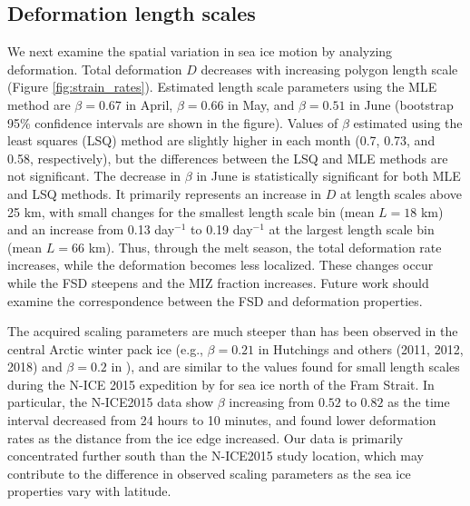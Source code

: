 \documentclass[review, jog]{igs}
\begin{document}
\subsection{Deformation length scales}
We next examine the spatial variation in sea ice motion by analyzing deformation.
Total deformation $D$ decreases with increasing polygon length scale (Figure \ref{fig:strain_rates}).
Estimated length scale parameters using the MLE method are $\beta=0.67$ in April, $\beta=0.66$ in May, and $\beta=0.51$ in June (bootstrap 95\% confidence intervals are shown in the figure). Values of $\beta$ estimated using the least squares (LSQ) method are slightly higher in each month (0.7, 0.73, and 0.58, respectively), but the differences between the LSQ and MLE methods are not significant.
The decrease in $\beta$ in June is statistically significant for both MLE and LSQ methods. 
It primarily represents an increase in $D$ at length scales above 25 km, with small changes for the smallest length scale bin (mean $L = 18$ km) and an increase from 0.13 day$^{-1}$ to 0.19 day$^{-1}$ at the largest length scale bin (mean $L = 66$ km). Thus, through the melt season, the total deformation rate increases, while the deformation becomes less localized. 
These changes occur while the FSD steepens and the MIZ fraction increases.
Future work should examine the correspondence between the FSD and deformation properties.

The acquired scaling parameters are much steeper than has been observed in the central Arctic winter pack ice (e.g., $\beta=0.21$ in Hutchings and others (2011, 2012, 2018) and $\beta=0.2$ in \cite{Marsan2004}), and are similar to the values found for small length scales during the N-ICE 2015 expedition by \cite{oikkonen2017_SmallScale} for sea ice north of the Fram Strait.
In particular, the N-ICE2015 data show $\beta$ increasing from $0.52$ to $0.82$ as the time interval decreased from 24 hours to 10 minutes, and found lower deformation rates as the distance from the ice edge increased.
Our data is primarily concentrated further south than the N-ICE2015 study location, which may contribute to the difference in observed scaling parameters as the sea ice properties vary with latitude.
\end{document}
